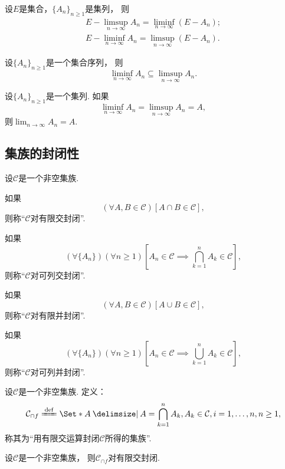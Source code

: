 \begin{proposition}
设\(E\)是集合，\(\{A_n\}_{n\geq1}\)是集列，
则\begin{gather}
	E - \limsup_{n\to\infty} A_n = \liminf_{n\to\infty} (E - A_n); \\
	E - \liminf_{n\to\infty} A_n = \limsup_{n\to\infty} (E - A_n).
\end{gather}
\end{proposition}

\begin{proposition}
设\(\{A_n\}_{n\geq1}\)是一个集合序列，
则\begin{equation}
	\liminf_{n\to\infty} A_n
	\subseteq
	\limsup_{n\to\infty} A_n.
\end{equation}
\end{proposition}

\begin{theorem}
设\(\{A_n\}_{n\geq1}\)是一个集列.
如果\[
	\liminf_{n\to\infty} A_n
	= \limsup_{n\to\infty} A_n
	= A,
\]
则\(\lim_{n\to\infty} A_n = A\).
\end{theorem}

\subsection{集族的封闭性}
\begin{definition}[集族的封闭性]
设\(\mathcal{C}\)是一个非空集族.

如果\[
	(\forall A,B\in\mathcal{C})
	[A \cap B \in \mathcal{C}],
\]
则称“\(\mathcal{C}\)对有限交封闭”.

如果\[
	(\forall \{A_n\})
	(\forall n\geq1)
	\left[A_n\in\mathcal{C} \implies \bigcap_{k=1}^n A_k \in \mathcal{C}\right],
\]
则称“\(\mathcal{C}\)对可列交封闭”.

如果\[
	(\forall A,B\in\mathcal{C})
	[A \cup B \in \mathcal{C}],
\]
则称“\(\mathcal{C}\)对有限并封闭”.

如果\[
	(\forall \{A_n\})
	(\forall n\geq1)
	\left[A_n\in\mathcal{C} \implies \bigcup_{k=1}^n A_k \in \mathcal{C}\right],
\]
则称“\(\mathcal{C}\)对可列并封闭”.
\end{definition}

\begin{definition}
设\(\mathcal{C}\)是一个非空集族.
定义：\[
	\mathcal{C}_{\cap f}
	\defeq
	\Set*{
		A \given
		A = \bigcap_{k=1}^n A_k,
		A_k \in \mathcal{C}, i=1,\dotsc,n,
		n\geq1
	},
\]
称其为“用有限交运算封闭\(\mathcal{C}\)所得的集族”.
\end{definition}

\begin{proposition}
设\(\mathcal{C}\)是一个非空集族，
则\(\mathcal{C}_{\cap f}\)对有限交封闭.
\end{proposition}
